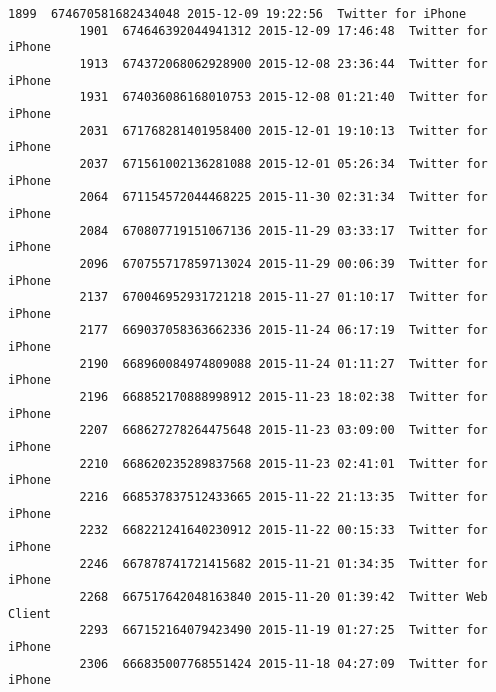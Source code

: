 \documentclass[11pt]{article}
\begin{document}
\begin{Verbatim}[commandchars=\\\{\}]
          1899  674670581682434048 2015-12-09 19:22:56  Twitter for iPhone   
          1901  674646392044941312 2015-12-09 17:46:48  Twitter for iPhone   
          1913  674372068062928900 2015-12-08 23:36:44  Twitter for iPhone   
          1931  674036086168010753 2015-12-08 01:21:40  Twitter for iPhone   
          2031  671768281401958400 2015-12-01 19:10:13  Twitter for iPhone   
          2037  671561002136281088 2015-12-01 05:26:34  Twitter for iPhone   
          2064  671154572044468225 2015-11-30 02:31:34  Twitter for iPhone   
          2084  670807719151067136 2015-11-29 03:33:17  Twitter for iPhone   
          2096  670755717859713024 2015-11-29 00:06:39  Twitter for iPhone   
          2137  670046952931721218 2015-11-27 01:10:17  Twitter for iPhone   
          2177  669037058363662336 2015-11-24 06:17:19  Twitter for iPhone   
          2190  668960084974809088 2015-11-24 01:11:27  Twitter for iPhone   
          2196  668852170888998912 2015-11-23 18:02:38  Twitter for iPhone   
          2207  668627278264475648 2015-11-23 03:09:00  Twitter for iPhone   
          2210  668620235289837568 2015-11-23 02:41:01  Twitter for iPhone   
          2216  668537837512433665 2015-11-22 21:13:35  Twitter for iPhone   
          2232  668221241640230912 2015-11-22 00:15:33  Twitter for iPhone   
          2246  667878741721415682 2015-11-21 01:34:35  Twitter for iPhone   
          2268  667517642048163840 2015-11-20 01:39:42  Twitter Web Client   
          2293  667152164079423490 2015-11-19 01:27:25  Twitter for iPhone   
          2306  666835007768551424 2015-11-18 04:27:09  Twitter for iPhone   
          

\end{Verbatim}
\end{document}
